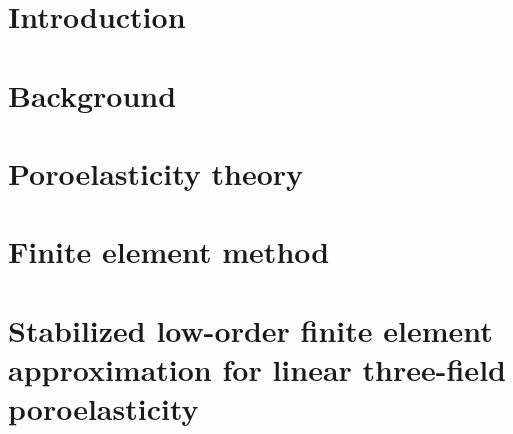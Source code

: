 \documentclass[letterpaper,12pt]{report}
\newenvironment{abstractchap}{\rightskip1in\itshape}{}
\begin{document}
\def\localpath{contents/frontmatter}


\tableofcontents
\newpage







%




\chapter{Introduction}

 
\chapter{Background}


\chapter{Poroelasticity theory}




\chapter{Finite element method}





\chapter{Stabilized low-order finite element approximation for linear three-field poroelasticity}
\label{chap:linear_poro}
% 
\end{document}
